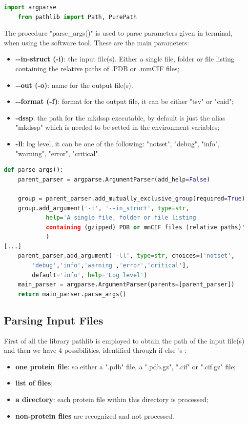 \begin{lstlisting}[language=Python, caption=Import\ libraries\ parsing, label={code:parseargs}]
    import argparse
    from pathlib import Path, PurePath
\end{lstlisting}

The procedure "parse\_args()" is used to parse parameters given in terminal, when using the software tool. These are the main parameters:
\begin{itemize}
    \item \textbf{-\vspace{0.1cm}-in-struct (-i)}: the input file(s). Either a single file, folder or file listing containing the relative paths of .PDB or .mmCIF files;
    \item \textbf{-\vspace{0.1cm}-out (-o)}: name for the output file(s).
    \item \textbf{-\vspace{0.1cm}-format (-f)}: format for the output file, it can be either "tsv" or "caid";
    \item \textbf{-dssp}: the path for the mkdssp executable, by default is just the alias "mkdssp" which is needed to be setted in the environment variables;
    \item \textbf{-ll}: log level, it can be one of the following: "notset", "debug", "info", "warning", "error", "critical".
\end{itemize}

\begin{lstlisting}[language=Python, caption=Command-line\ arguments\ parsing.]
def parse_args():
    parent_parser = argparse.ArgumentParser(add_help=False)

    group = parent_parser.add_mutually_exclusive_group(required=True)
    group.add_argument('-i', '--in_struct', type=str,
            help='A single file, folder or file listing 
            containing (gzipped) PDB or mmCIF files (relative paths)'
            )   
[...]
    parent_parser.add_argument('-ll', type=str, choices=['notset',
        'debug','info','warning','error','critical'], 
        default='info', help='Log level')
    main_parser = argparse.ArgumentParser(parents=[parent_parser])
    return main_parser.parse_args()
\end{lstlisting}

\subsection{Parsing Input Files}
First of all the library pathlib is employed to obtain the path of the input file(s) and then we have 4 possibilities, identified through if-else 's :
\begin{itemize}
    \item \textbf{one protein file}: so either a ".pdb" file, a ".pdb.gz", ".cif" or ".cif.gz" file;
    \item \textbf{list of files};
    \item \textbf{a directory}: each protein file within this directory is processed;
    \item \textbf{non-protein files} are recognized and not processed.
\end{itemize}

